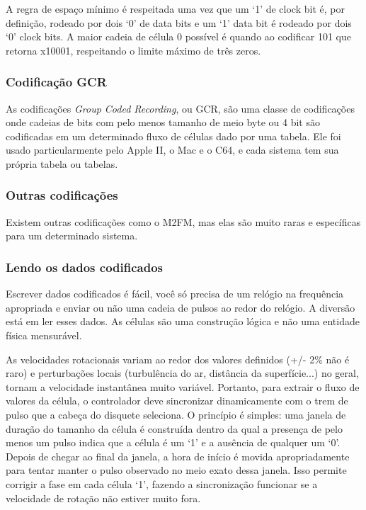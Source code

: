 \documentclass[letterpaper,10pt,brazil]{sphinxmanual}
\begin{document}
A regra de espaço mínimo é respeitada uma vez que um `1' de clock bit é,
por definição, rodeado por dois `0' de data bits e um `1' data bit é
rodeado por dois `0' clock bits. A maior cadeia de célula 0 possível é
quando ao codificar 101 que retorna x10001, respeitando o limite máximo
de três zeros.


\subsubsection{Codificação GCR}
\label{techspecs/floppy:codificacao-gcr}
As codificações \emph{Group Coded Recording}, ou GCR, são uma classe de
codificações onde cadeias de bits com pelo menos tamanho de meio byte ou
4 bit são codificadas em um determinado fluxo de células dado por uma
tabela. Ele foi usado particularmente pelo Apple II, o Mac e o C64, e
cada sistema tem sua própria tabela ou tabelas.


\subsubsection{Outras codificações}
\label{techspecs/floppy:outras-codificacoes}
Existem outras codificações como o M2FM, mas elas são muito raras e
específicas para um determinado sistema.


\subsubsection{Lendo os dados codificados}
\label{techspecs/floppy:lendo-os-dados-codificados}
Escrever dados codificados é fácil, você só precisa de um relógio na
frequência apropriada e enviar ou não uma cadeia de pulsos ao redor do
relógio. A diversão está em ler esses dados.
As células são uma construção lógica e não uma entidade física
mensurável.

As velocidades rotacionais variam ao redor dos valores definidos (+/- 2\%
não é raro) e perturbações locais (turbulência do ar, distância da
superfície...) no geral, tornam a velocidade instantânea muito variável.
Portanto, para extrair o fluxo de valores da célula, o controlador deve
sincronizar dinamicamente com o trem de pulso que a cabeça do disquete
seleciona. O princípio é simples: uma janela de duração do tamanho da
célula é construída dentro da qual a presença de pelo menos um pulso
indica que a célula é um `1' e a ausência de qualquer um `0'.
Depois de chegar ao final da janela, a hora de início é movida
apropriadamente para tentar manter o pulso observado no meio exato dessa
janela. Isso permite corrigir a fase em cada célula `1', fazendo a
sincronização funcionar se a velocidade de rotação não estiver muito
fora.
\end{document}
